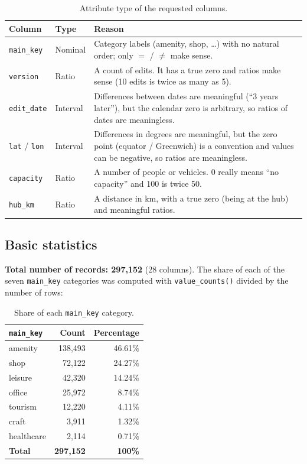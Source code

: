\documentclass[11pt,a4paper]{article}
\newcommand{\col}[1]{\texttt{#1}}
\begin{document}
\begin{table}[H]
\centering
\caption{Attribute type of the requested columns.}
\begin{tabularx}{\textwidth}{>{\raggedright\arraybackslash}p{2.6cm}>{\raggedright\arraybackslash}p{2cm}X}
\toprule
\textbf{Column} & \textbf{Type} & \textbf{Reason} \\
\midrule
\col{main\_key} & Nominal & Category labels (amenity, shop, \dots) with no natural order; only $=$ / $\neq$ make sense. \\
\col{version} & Ratio & A count of edits. It has a true zero and ratios make sense (10 edits is twice as many as 5). \\
\col{edit\_date} & Interval & Differences between dates are meaningful (``3 years later''), but the calendar zero is arbitrary, so ratios of dates are meaningless. \\
\col{lat} / \col{lon} & Interval & Differences in degrees are meaningful, but the zero point (equator / Greenwich) is a convention and values can be negative, so ratios are meaningless. \\
\col{capacity} & Ratio & A number of people or vehicles. 0 really means ``no capacity'' and 100 is twice 50. \\
\col{hub\_km} & Ratio & A distance in km, with a true zero (being at the hub) and meaningful ratios. \\
\bottomrule
\end{tabularx}
\end{table}

\subsection{Basic statistics}

\textbf{Total number of records: 297{,}152} (28 columns).
The share of each of the seven \col{main\_key} categories was computed with
\col{value\_counts()} divided by the number of rows:

\begin{table}[H]
\centering
\caption{Share of each \col{main\_key} category.}
\begin{tabular}{lrr}
\toprule
\col{main\_key} & \textbf{Count} & \textbf{Percentage} \\
\midrule
amenity    & 138{,}493 & 46.61\% \\
shop       & 72{,}122  & 24.27\% \\
leisure    & 42{,}320  & 14.24\% \\
office     & 25{,}972  & 8.74\%  \\
tourism    & 12{,}220  & 4.11\%  \\
craft      & 3{,}911   & 1.32\%  \\
healthcare & 2{,}114   & 0.71\%  \\
\midrule
\textbf{Total} & \textbf{297{,}152} & \textbf{100\%} \\
\bottomrule
\end{tabular}
\end{table}
\end{document}
